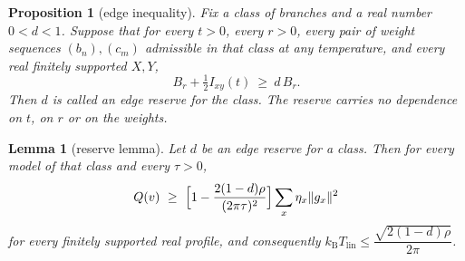 \documentclass[aps,10pt,superscriptaddress,floatfix,amsmath,amssymb,nofootinbib]{revtex4-2}
\newcommand{\kb}{k_{\mathrm B}}
\newcommand{\Tlin}{T_{\mathrm{lin}}}
\newtheorem{lemma}{Lemma}
\newtheorem{proposition}{Proposition}
\begin{document}
\begin{proposition}[edge inequality]\label{prop:edge}
Fix a class of branches and a real number $0<d<1$. Suppose that for every $t>0$, every
$r>0$, every pair of weight sequences $(b_n),(c_m)$ admissible in that class at any
temperature, and every real finitely supported $X,Y$,
\begin{equation}\label{eq:edge}
B_r+\tfrac12 I_{xy}(t)\ \ge\ d\,B_r .
\end{equation}
Then $d$ is called an \emph{edge reserve} for the class. The reserve carries no dependence
on $t$, on $r$ or on the weights.
\end{proposition}

\begin{lemma}[reserve lemma]\label{lem:reserve}
Let $d$ be an edge reserve for a class. Then for every model of that class and every
$\tau>0$,
\begin{equation}\label{eq:Qbound}
Q(v)\ \ge\ \Bigl[1-\frac{2(1-d)\rho}{(2\pi\tau)^{2}}\Bigr]\sum_x\eta_x\|g_x\|^{2}
\end{equation}
for every finitely supported real profile, and consequently
$\kb\Tlin\le\dfrac{\sqrt{2(1-d)\rho}}{2\pi}$.
\end{lemma}
\end{document}
